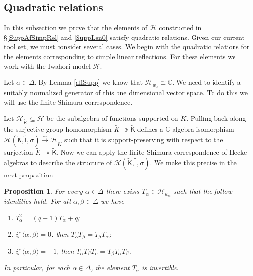 \documentclass[10pt, letterpaper]{amsart}
\theoremstyle{plain}
\newtheorem{Prop}[equation]{Proposition}
\theoremstyle{definition}
\numberwithin{equation}{section}
\newcommand{\Kt}{\widetilde{K}}
\newcommand{\Hcal}{\mathcal{H}}
\newcommand{\If}{\mathsf{I}}
\newcommand{\Kf}{\mathsf{K}}
\begin{document}
\subsection{Quadratic relations}\label{SS:QuadRel}


In this subsection we prove that the elements of $\Hcal$ constructed in \S \ref{SuppAfSimpRel} and \ref{SuppLen0} satisfy quadratic relations. Given our current tool set, we must consider several cases. We begin with the quadratic relations for the elements corresponding to simple linear reflections. For these elements we work with the Iwahori model $\Hcal$.

Let $\alpha\in \Delta$. By Lemma \ref{affSupp} we know that $\Hcal_{w_{\alpha}}\cong \mathbb{C}$. We need to identify a suitably normalized generator of this one dimensional vector space. To do this we will use the finite Shimura correspondence.

Let $\Hcal_{\Kt}\subseteq\Hcal$ be the subalgebra of functions supported on $\Kt$. Pulling back along the surjective group homomorphism $\Kt\twoheadrightarrow \widetilde{{\Kf}}$ defines a $\mathbb{C}$-algebra isomorphism $\Hcal(\widetilde{{\Kf}},\widetilde{{\If}},\sigma)\stackrel{\sim}{\rightarrow} \Hcal_{\Kt}$ such that it is support-preserving with respect to the surjection $\Kt\twoheadrightarrow \widetilde{{\Kf}}$. Now we can apply the finite Shimura correspondence of Hecke algebras to describe the structure of $\Hcal(\widetilde{{\Kf}},\widetilde{{\If}},\sigma)$. We make this precise in the next proposition.

\begin{Prop}\label{QuadBraidSimpLinReflect}
	For every $\alpha\in\Delta$ there exists $T_{\alpha}\in \Hcal_{w_{\alpha}}$ such that the follow identities hold. For all $\alpha,\beta\in \Delta$ we have 
	\begin{enumerate}
		\item $T_{\alpha}^{2}=(q-1)T_{\alpha}+q$;\label{QuadSimpLin}
		\item if $\langle\alpha,\beta\rangle=0$, then $T_{\alpha}T_{\beta}=T_{\beta}T_{\alpha}$;\label{CommSimpLin}
		\item if $\langle\alpha,\beta\rangle=-1$, then $T_{\alpha}T_{\beta}T_{\alpha}=T_{\beta}T_{\alpha}T_{\beta}$.\label{BraidSimpLin}
	\end{enumerate}
In particular, for each $\alpha\in\Delta$, the element $T_{\alpha}$ is invertible.
\end{Prop}
\end{document}
